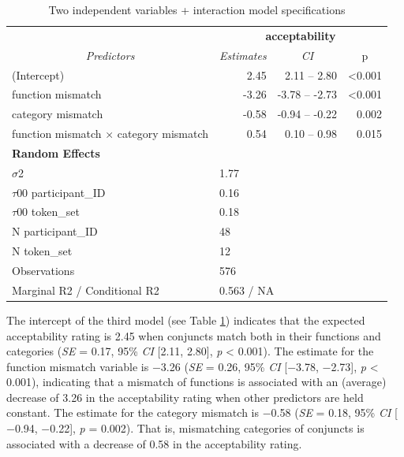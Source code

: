 \begin{table}[!h]
	\centering
	\begin{tabular}{llrr}
		\hline \hline
		\multicolumn{1}{c}{\textbf{}}         & \multicolumn{3}{c}{\textbf{acceptability}}                          \\
		\multicolumn{1}{c}{\textit{Predictors}} & \multicolumn{1}{c}{\textit{Estimates}} & \multicolumn{1}{c}{\textit{CI}} & \multicolumn{1}{c}{p} \\ \hline
		(Intercept)                           & \multicolumn{1}{r}{2.45}  & 2.11 – 2.80   & \textless{}0.001 \\
		function mismatch                     & \multicolumn{1}{r}{-3.26} & -3.78 – -2.73 & \textless{}0.001 \\
		category mismatch                     & \multicolumn{1}{r}{-0.58} & -0.94 – -0.22 & 0.002            \\
		function mismatch × category mismatch & \multicolumn{1}{r}{0.54}  & 0.10 – 0.98   & 0.015            \\
		\multicolumn{4}{l}{\textbf{Random Effects}}                                                          \\
		$\sigma$2                                    & \multicolumn{3}{l}{1.77}                                     \\
		$\tau$00 participant\_ID                   & \multicolumn{3}{l}{0.16}                                     \\
		$\tau$00 token\_set                        & \multicolumn{3}{l}{0.18}                                     \\
		N participant\_ID                        & \multicolumn{3}{l}{48}                                                         \\
		N token\_set                          & \multicolumn{3}{l}{12}                                       \\ \hline
		Observations                          & \multicolumn{3}{l}{576}                                      \\
		Marginal R2 / Conditional R2          & \multicolumn{3}{l}{0.563 / NA} \\ \hline \hline                              
	\end{tabular}
	\caption{Two independent variables + interaction model specifications}
	\label{tab:catmodel3}
\end{table}
The intercept of the third model (see Table \ref{tab:catmodel3}) indicates that the expected acceptability rating is 2.45 when conjuncts match both in their functions and categories (\textit{SE} = 0.17, 95\% \textit{CI} [2.11, 2.80], \textit{p} < 0.001). The estimate for the function mismatch variable is $-$3.26 (\textit{SE} = 0.26, 95\% \textit{CI} [$-$3.78, $-$2.73], \textit{p} < 0.001), indicating that a mismatch of functions is associated with an (average) decrease of 3.26 in the acceptability rating when other predictors are held constant. The estimate for the category mismatch is $-$0.58 (\textit{SE} = 0.18, 95\% \textit{CI} [$-$0.94, $-$0.22], \textit{p} = 0.002). That is, mismatching categories of conjuncts is associated with a decrease of 0.58 in the acceptability rating. 


